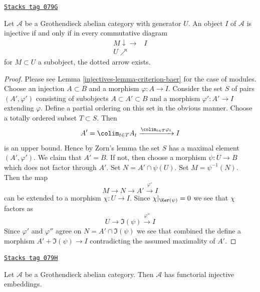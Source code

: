 \begin{lemma}
\label{injectives-lemma-characterize-injective}
\href{https://stacks.math.columbia.edu/tag/079G}{\texttt{Stacks tag 079G}}


Let $\mathcal{A}$ be a Grothendieck abelian category with generator $U$.
An object $I$ of $\mathcal{A}$ is injective if and only if in every
commutative diagram
$$
\begin{array}{cc}M \downarrow\longrightarrow & I \\ U \nearrow & \end{array}
$$
for $M \subset U$ a subobject, the dotted arrow exists.
\end{lemma}

\begin{proof}

Please see Lemma \ref{injectives-lemma-criterion-baer} for the case of modules.
Choose an injection $A \subset B$ and a morphism $\varphi : A \to I$.
Consider the set $S$ of pairs $(A', \varphi')$ consisting of
subobjects $A \subset A' \subset B$ and a morphism $\varphi' : A' \to I$
extending $\varphi$. Define a partial ordering on this set in the obvious
manner. Choose a totally ordered subset $T \subset S$. Then
$$
A' = \colim_{t \in T} A_t \xrightarrow{\colim_{t \in T} \varphi_t} I
$$
is an upper bound. Hence by Zorn's lemma the set $S$ has a maximal element
$(A', \varphi')$. We claim that $A' = B$. If not, then choose a morphism
$\psi : U \to B$ which does not factor through $A'$. Set
$N = A' \cap \psi(U)$. Set $M = \psi^{-1}(N)$. Then the map
$$
M \to N \to A' \xrightarrow{\varphi'} I
$$
can be extended to a morphism $\chi : U \to I$. Since
$\chi|_{\Ker(\psi)} = 0$ we see that $\chi$ factors as
$$
U \to \Im(\psi) \xrightarrow{\varphi''} I
$$
Since $\varphi'$ and $\varphi''$ agree on $N = A' \cap \Im(\psi)$
we see that combined the define a morphism $A' + \Im(\psi) \to I$
contradicting the assumed maximality of $A'$.
\end{proof}

\begin{theorem}
\label{injectives-theorem-injective-embedding-grothendieck}
\href{https://stacks.math.columbia.edu/tag/079H}{\texttt{Stacks tag 079H}}

Let $\mathcal{A}$ be a Grothendieck abelian category.
Then $\mathcal{A}$ has functorial injective embeddings.
\end{theorem}

